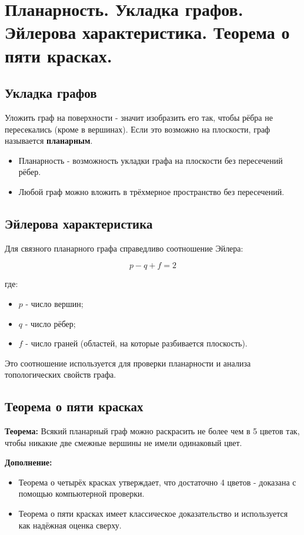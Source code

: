 {
	\section{Планарность. Укладка графов. Эйлерова характеристика. Теорема о пяти красках.}


\subsection*{Укладка графов}

Уложить граф на поверхности - значит изобразить его так, чтобы рёбра не пересекались (кроме в вершинах).  
Если это возможно на плоскости, граф называется \textbf{планарным}.

\begin{itemize}
  \item Планарность - возможность укладки графа на плоскости без пересечений рёбер.
  \item Любой граф можно вложить в трёхмерное пространство без пересечений.
\end{itemize}

\subsection*{Эйлерова характеристика}

Для связного планарного графа справедливо соотношение Эйлера:


\[
p - q + f = 2
\]


где:
\begin{itemize}
  \item $p$ - число вершин;
  \item $q$ - число рёбер;
  \item $f$ - число граней (областей, на которые разбивается плоскость).
\end{itemize}

Это соотношение используется для проверки планарности и анализа топологических свойств графа.

\subsection*{Теорема о пяти красках}

\textbf{Теорема:} Всякий планарный граф можно раскрасить не более чем в 5 цветов так, чтобы никакие две смежные вершины не имели одинаковый цвет.

\textbf{Дополнение:}
\begin{itemize}
  \item Теорема о четырёх красках утверждает, что достаточно 4 цветов - доказана с помощью компьютерной проверки.
  \item Теорема о пяти красках имеет классическое доказательство и используется как надёжная оценка сверху.
\end{itemize}

}
